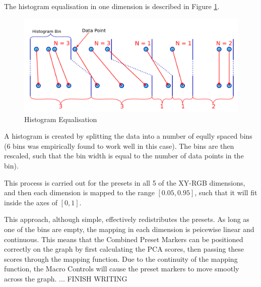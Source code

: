 \documentclass[11pt, oneside]{report}   	%
\begin{document}
The histogram equalisation in one dimension is described in Figure \ref{fig:HistEq}.
\begin{figure}[h] 
	\centering
	\includegraphics[width = 6in]{HistogramEquilisation.png}
	\caption{Histogram Equalisation}
	\label{fig:HistEq}
\end{figure}
A histogram is created by splitting the data into a number of eqully spaced bins (6 bins was empirically found to work well in this case). The bins are then rescaled, such that the bin width is equal to the number of data points in the bin).

This process is carried out for the presets in all 5 of the XY-RGB dimensions, and then each dimension is mapped to the range $[0.05, 0.95]$, such that it will fit inside the axes of $[0, 1]$.

This approach, although simple, effectively redistributes the presets. As long as one of the bins are empty, the mapping in each dimension is peicewise linear and continuous. This means that the Combined Preset Markers can be positioned correctly on the graph by first calculating the PCA scores, then passing these scores through the mapping function. Due to the continuity of the mapping function, the Macro Controls will cause the preset markers to move smootly across the graph. ... FINISH WRITING
\end{document}
